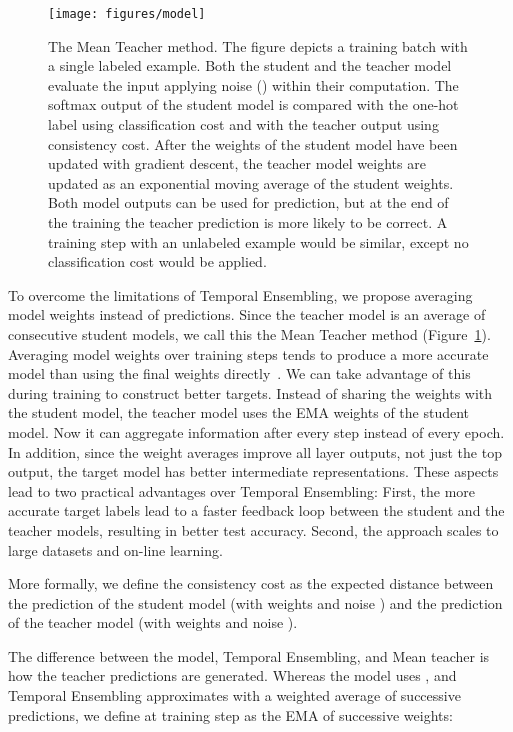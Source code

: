 \documentclass{article}
\begin{document}
\begin{figure}[t]
\vskip 0.2in
\begin{center}
\centerline{\texttt{[image: figures/model]}}
\caption{The Mean Teacher method.
The figure depicts a training batch with a single labeled example.
Both the student and the teacher model evaluate the input applying noise () within their computation.
The softmax output of the student model is compared with the one-hot label using classification cost and with the teacher output using consistency cost.
After the weights of the student model have been updated with gradient descent, the teacher model weights are updated as an exponential moving average of the student weights.
Both model outputs can be used for prediction, but at the end of the training the teacher prediction is more likely to be correct.
A training step with an unlabeled example would be similar, except no classification cost would be applied.}
\label{fig:model}
\end{center}
\vskip -0.2in
\end{figure}

To overcome the limitations of Temporal Ensembling, we propose averaging model weights instead of predictions.
Since the teacher model is an average of consecutive student models, we call this the Mean Teacher method (Figure~\ref{fig:model}).
Averaging model weights over training steps tends to produce a more accurate model than using the final weights directly~\citep{polyak_acceleration_1992}.
We can take advantage of this during training to construct better targets.
Instead of sharing the weights with the student model, the teacher model uses the EMA weights of the student model.
Now it can aggregate information after every step instead of every epoch.
In addition, since the weight averages improve all layer outputs, not just the top output, the target model has better intermediate representations.
These aspects lead to two practical advantages over Temporal Ensembling:
First, the more accurate target labels lead to a faster feedback loop between the student and the teacher models, resulting in better test accuracy.
Second, the approach scales to large datasets and on-line learning.

More formally, we define the consistency cost  as the expected distance between the prediction of the student model (with weights  and noise ) and the prediction of the teacher model (with weights   and noise ).



The difference between the  model, Temporal Ensembling, and Mean teacher is how the teacher predictions are generated. Whereas the  model uses , and Temporal Ensembling approximates  with a weighted average of successive predictions, we define  at training step  as the EMA of successive  weights:
\end{document}
